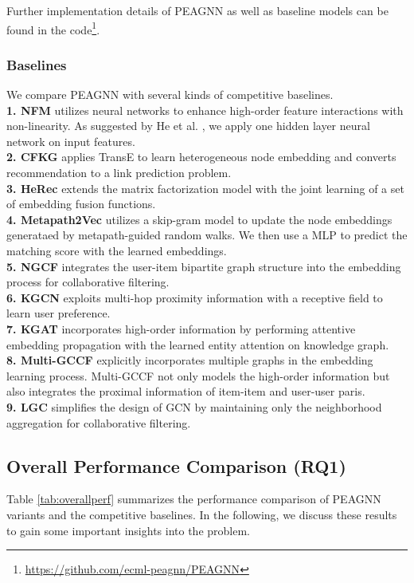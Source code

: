 \documentclass[runningheads, envcountsame, a4paper]{llncs}
\begin{document}
Further implementation details of PEAGNN as well as baseline models can be found in the code\footnote[3]{
\url{https://github.com/ecml-peagnn/PEAGNN}}.


\subsubsection{Baselines}
We compare PEAGNN with several kinds of competitive baselines.
\\
\textbf{1. NFM} \cite{he2017bneural} utilizes 
    neural networks to enhance high-order feature 
    interactions with non-linearity. As suggested by 
    He et al. \cite{he2017bneural}, we apply one 
    hidden layer neural network on input features.\\
\textbf{2. CFKG} \cite{ai2018learning} applies 
TransE \cite{bordes2013translating} to learn
heterogeneous node embedding  and converts 
recommendation to a link prediction problem.\\
\textbf{3. HeRec} \cite{dong2017metapath2vec} extends the matrix factorization model with the joint learning of a set of embedding fusion functions.\\
\textbf{4. Metapath2Vec} \cite{dong2017metapath2vec} utilizes a skip-gram model to update the node embeddings generataed by metapath-guided random walks. We then use a MLP to predict the matching score with the learned embeddings.\\
\textbf{5. NGCF} \cite{wang2019neural} integrates the user-item bipartite graph structure into the embedding process for 
    collaborative filtering.\\
\textbf{6. KGCN} \cite{wang2019knowledge} exploits multi-hop proximity information with a receptive field to learn user preference.\\
\textbf{7. KGAT} \cite{wang2019kgat} incorporates high-order information by performing attentive embedding propagation with the learned entity attention on knowledge graph.\\
\textbf{8. Multi-GCCF} \cite{sun2019multi} explicitly incorporates multiple
graphs in the embedding learning process. Multi-GCCF not
only models the high-order information but also integrates the
proximal information of item-item and user-user paris.\\
\textbf{9. LGC} \cite{he2020lightgcn} simplifies the design of GCN by maintaining only the neighborhood aggregation for
collaborative filtering.

\subsection{Overall Performance Comparison (\textbf{RQ1})}
Table \ref{tab:overallperf} summarizes the performance comparison of PEAGNN variants and the competitive baselines.
In the following, we discuss these results to gain some important insights into the problem.
\end{document}

